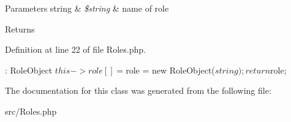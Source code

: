 \begin{DoxyParams}[1]{\-Parameters}
string & {\em \$string} & name of role\\
\hline
\end{DoxyParams}
\begin{DoxyReturn}{\-Returns}

\end{DoxyReturn}


\-Definition at line 22 of file \-Roles.\-php.


\begin{DoxyCode}
                                         : RoleObject
    {
        $this->role[] = $role = new RoleObject($string);

        return $role;
    }
\end{DoxyCode}


\-The documentation for this class was generated from the following file\-:\begin{DoxyCompactItemize}
\item 
src/\-Roles.\-php\end{DoxyCompactItemize}
